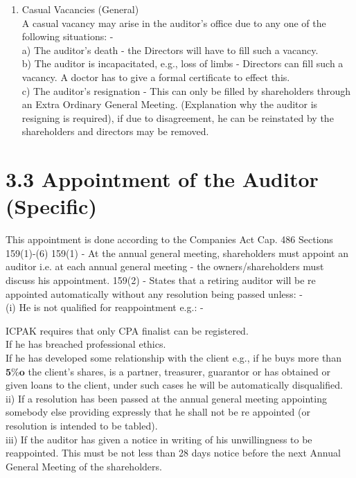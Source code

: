 \documentclass[10pt]{article}
\begin{document}
\begin{enumerate}
(c) If any one shareholder has given a notice for a resolution, -intending to appoint someone else then the auditor cannot be re-appointed automatically.
  \item Casual Vacancies (General)\\
  A casual vacancy may arise in the auditor's office due to any one of the following situations: -\\
  a) The auditor's death - the Directors will have to fill such a vacancy.\\
  b) The auditor is incapacitated, e.g., loss of limbs - Directors can fill such a vacancy. A doctor has to give a formal certificate to effect this.\\
  c) The auditor's resignation - This can only be filled by shareholders through an Extra Ordinary General Meeting. (Explanation why the auditor is resigning is required), if due to disagreement, he can be reinstated by the shareholders and directors may be removed.
\end{enumerate}

\section*{3.3 Appointment of the Auditor (Specific)}
This appointment is done according to the Companies Act Cap. 486 Sections 159(1)-(6) 159(1) - At the annual general meeting, shareholders must appoint an auditor i.e. at each annual general meeting - the owners/shareholders must discuss his appointment. 159(2) - States that a retiring auditor will be re appointed automatically without any resolution being passed unless: -\\
(i) He is not qualified for reappointment e.g.: -

ICPAK requires that only CPA finalist can be registered.\\
If he has breached professional ethics.\\
If he has developed some relationship with the client e.g., if he buys more than $\mathbf{5 \%} \boldsymbol{o}$ the client's shares, is a partner, treasurer, guarantor or has obtained or given loans to the client, under such cases he will be automatically disqualified.\\
ii) If a resolution has been passed at the annual general meeting appointing somebody else providing expressly that he shall not be re appointed (or resolution is intended to be tabled).\\
iii) If the auditor has given a notice in writing of his unwillingness to be reappointed. This must be not less than 28 days notice before the next Annual General Meeting of the shareholders.
\end{document}
